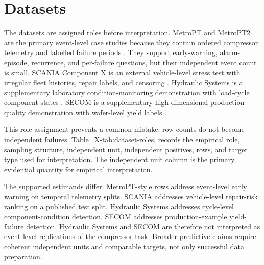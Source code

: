 \section{Datasets}
\label{sec:datasets}

The datasets are assigned roles before interpretation. MetroPT and MetroPT2 are the primary event-level case studies because they contain ordered compressor telemetry and labelled failure periods \citep{Veloso2022MetroPT,MetroPT2Zenodo2023}. They support early-warning, alarm-episode, recurrence, and per-failure questions, but their independent event count is small. SCANIA Component X is an external vehicle-level stress test with irregular fleet histories, repair labels, and censoring \citep{Kharazian2025Scania}. Hydraulic Systems is a supplementary laboratory condition-monitoring demonstration with load-cycle component states \citep{Helwig2018HydraulicSystems}. SECOM is a supplementary high-dimensional production-quality demonstration with wafer-level yield labels \citep{McCann2008SECOM}.

This role assignment prevents a common mistake: row counts do not become independent failures. Table~\ref{X-tab:dataset-roles} records the empirical role, sampling structure, independent unit, independent positives, rows, and target type used for interpretation. The independent unit column is the primary evidential quantity for empirical interpretation.


The supported estimands differ. MetroPT-style rows address event-level early warning on temporal telemetry splits. SCANIA addresses vehicle-level repair-risk ranking on a published test split. Hydraulic Systems addresses cycle-level component-condition detection. SECOM addresses production-example yield-failure detection. Hydraulic Systems and SECOM are therefore not interpreted as event-level replications of the compressor task. Broader predictive claims require coherent independent units and comparable targets, not only successful data preparation.
